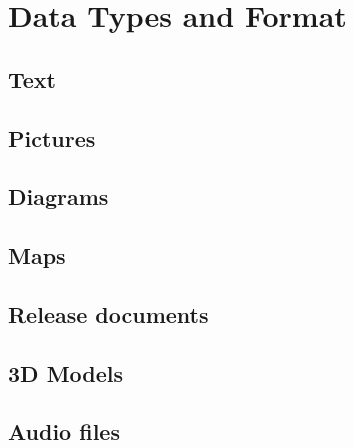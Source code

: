 \section{Data Types and Format}

\subsection{Text}

\subsection{Pictures}

\subsection{Diagrams}

\subsection{Maps}

\subsection{Release documents}

\subsection{3D Models}

\subsection{Audio files}


